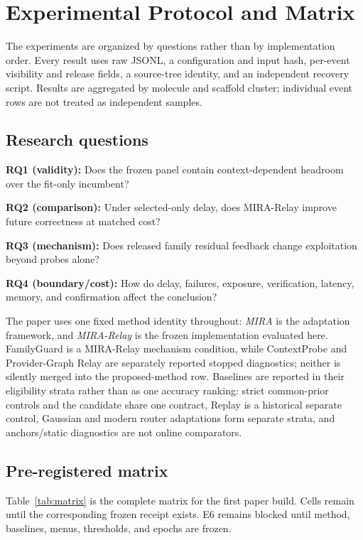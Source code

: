 \documentclass[sigconf,anonymous]{aamas}
\newcommand{\tbd}{\text{TBD}}
\begin{document}
\section{Experimental Protocol and Matrix}
The experiments are organized by questions rather than by implementation order. Every result uses raw JSONL, a configuration and input hash, per-event visibility and release fields, a source-tree identity, and an independent recovery script. Results are aggregated by molecule and scaffold cluster; individual event rows are not treated as independent samples.

\subsection{Research questions}
\textbf{RQ1 (validity):} Does the frozen panel contain context-dependent headroom over the fit-only incumbent?\par
\textbf{RQ2 (comparison):} Under selected-only delay, does MIRA-Relay improve future correctness at matched cost?\par
\textbf{RQ3 (mechanism):} Does released family residual feedback change exploitation beyond probes alone?\par
\textbf{RQ4 (boundary/cost):} How do delay, failures, exposure, verification, latency, memory, and confirmation affect the conclusion?

The paper uses one fixed method identity throughout: \emph{MIRA} is the adaptation framework, and
\emph{MIRA-Relay} is the frozen implementation evaluated here. FamilyGuard is a MIRA-Relay
mechanism condition, while ContextProbe and Provider-Graph Relay are separately reported stopped
diagnostics; neither is silently merged into the proposed-method row. Baselines are reported in
their eligibility strata rather than as one accuracy ranking: strict common-prior controls and the
candidate share one contract, Replay is a historical separate control, Gaussian and modern router
adaptations form separate strata, and anchors/static diagnostics are not online comparators.

\subsection{Pre-registered matrix}
Table~\ref{tab:matrix} is the complete matrix for the first paper build. Cells remain \tbd{} until the corresponding frozen receipt exists. E6 remains blocked until method, baselines, menus, thresholds, and epochs are frozen.
\end{document}
